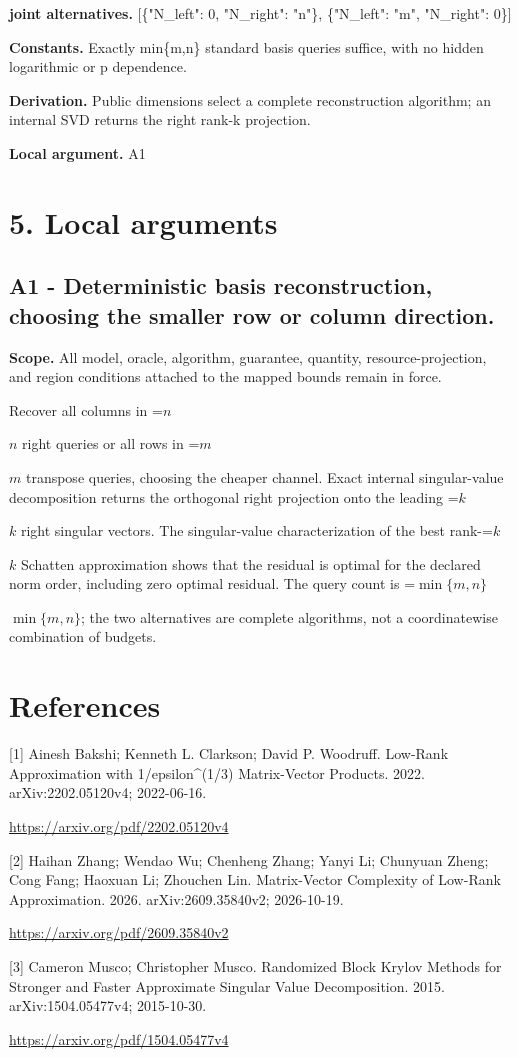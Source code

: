 \documentclass[10pt,a4paper]{article}
\newcommand{\AtlasMath}[1]{\par\begingroup\centering\setbox0=\hbox{$\displaystyle #1$}\ifdim\wd0>1.4\linewidth\typeout{ATLAS WIDE FORMULA: \the\wd0}\fi\ifdim\wd0>\linewidth\resizebox{\linewidth}{!}{\box0}\else\box0\fi\par\endgroup}
\newcommand{\AtlasInlineMath}[1]{\begingroup\setbox0=\hbox{$#1$}\ifdim\wd0>.4\linewidth\endgroup\AtlasMath{#1}\else\endgroup$#1$\fi}
\begin{document}
\textbf{joint alternatives.} [\{"N\_left": 0, "N\_right": "n"\}, \{"N\_left": "m", "N\_right": 0\}]

\textbf{Constants.} Exactly min\{m,n\} standard basis queries suffice, with no hidden logarithmic or p dependence.

\textbf{Derivation.} Public dimensions select a complete reconstruction algorithm; an internal SVD returns the right rank-k projection.

\textbf{Local argument.} A1

\section{5. Local arguments}
\subsection{A1 - Deterministic basis reconstruction, choosing the smaller row or column direction.}
\textbf{Scope.} All model, oracle, algorithm, guarantee, quantity, resource-projection, and region conditions attached to the mapped bounds remain in force.

Recover all columns in \AtlasInlineMath{n} right queries or all rows in \AtlasInlineMath{m} transpose queries, choosing the cheaper channel. Exact internal singular-value decomposition returns the orthogonal right projection onto the leading \AtlasInlineMath{k} right singular vectors. The singular-value characterization of the best rank-\AtlasInlineMath{k} Schatten approximation shows that the residual is optimal for the declared norm order, including zero optimal residual. The query count is \AtlasInlineMath{\min\{m,n\}}; the two alternatives are complete algorithms, not a coordinatewise combination of budgets.

\section{References}
[1] Ainesh Bakshi; Kenneth L. Clarkson; David P. Woodruff. Low-Rank Approximation with 1/epsilon\textasciicircum{}(1/3) Matrix-Vector Products. 2022. arXiv:2202.05120v4; 2022-06-16.

\url{https://arxiv.org/pdf/2202.05120v4}

[2] Haihan Zhang; Wendao Wu; Chenheng Zhang; Yanyi Li; Chunyuan Zheng; Cong Fang; Haoxuan Li; Zhouchen Lin. Matrix-Vector Complexity of Low-Rank Approximation. 2026. arXiv:2609.35840v2; 2026-10-19.

\url{https://arxiv.org/pdf/2609.35840v2}

[3] Cameron Musco; Christopher Musco. Randomized Block Krylov Methods for Stronger and Faster Approximate Singular Value Decomposition. 2015. arXiv:1504.05477v4; 2015-10-30.

\url{https://arxiv.org/pdf/1504.05477v4}
\end{document}
